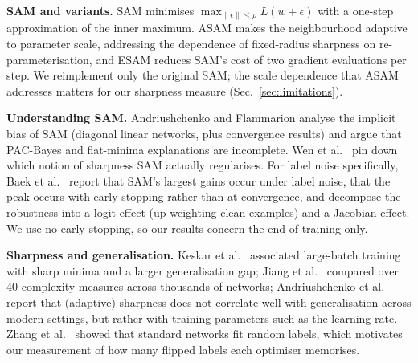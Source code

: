 \textbf{SAM and variants.} SAM \cite{foret2020sharpness} minimises $\max_{\|\epsilon\|\le\rho}L(w+\epsilon)$ with a one-step approximation of the inner maximum. ASAM \cite{kwon2021asam} makes the neighbourhood adaptive to parameter scale, addressing the dependence of fixed-radius sharpness on re-parameterisation, and ESAM \cite{du2021efficient} reduces SAM's cost of two gradient evaluations per step. We reimplement only the original SAM; the scale dependence that ASAM addresses matters for our sharpness measure (Sec.~\ref{sec:limitations}).

\textbf{Understanding SAM.} Andriushchenko and Flammarion \cite{andriushchenko2022understanding} analyse the implicit bias of SAM (diagonal linear networks, plus convergence results) and argue that PAC-Bayes and flat-minima explanations are incomplete. Wen et al.\ \cite{wen2022how} pin down which notion of sharpness SAM actually regularises. For label noise specifically, Baek et al.\ \cite{baek2024why} report that SAM's largest gains occur under label noise, that the peak occurs with early stopping rather than at convergence, and decompose the robustness into a logit effect (up-weighting clean examples) and a Jacobian effect. We use no early stopping, so our results concern the end of training only.

\textbf{Sharpness and generalisation.} Keskar et al.\ \cite{keskar2016large} associated large-batch training with sharp minima and a larger generalisation gap; Jiang et al.\ \cite{jiang2019fantastic} compared over 40 complexity measures across thousands of networks; Andriushchenko et al.\ \cite{andriushchenko2023modern} report that (adaptive) sharpness does not correlate well with generalisation across modern settings, but rather with training parameters such as the learning rate. Zhang et al.\ \cite{zhang2016understanding} showed that standard networks fit random labels, which motivates our measurement of how many flipped labels each optimiser memorises.
